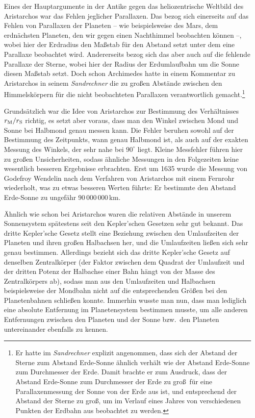 Eines der Hauptargumente in der Antike gegen das heliozentrische Weltbild des Aristarchos war 
das Fehlen jeglicher Parallaxen. Das bezog sich einerseits auf das Fehlen von Parallaxen der 
Planeten -- wie beispielsweise des Mars, dem erdn\"achsten Planeten, den wir gegen einen Nachthimmel 
beobachten k\"onnen --, wobei hier der Erdradius den Ma\ss stab f\"ur den Abstand setzt
unter dem eine Parallaxe beobachtet wird. Andererseits bezog sich das aber auch auf die 
fehlende Parallaxe der Sterne,
wobei hier der Radius der Erdumlaufbahn um die Sonne diesen Ma\ss stab setzt. Doch schon
Archimedes hatte in einem Kommentar zu Aristarchos in seinem 
\textit{Sandrechner} die
zu gro\ss en Abst\"ande zwischen den Himmelsk\"orpern f\"ur die nicht beobachteten Parallaxen 
verantwortlich gemacht.\footnote{Er hatte im \textit{Sandrechner}
explizit angenommen, dass sich der Abstand der Sterne zum Abstand Erde-Sonne \"ahnlich verh\"alt
wie der Abstand Erde-Sonne zum Durchmesser der Erde. Damit brachte er zum Ausdruck, dass
der Abstand Erde-Sonne zum Durchmesser der Erde zu gro\ss\ f\"ur eine Parallaxenmessung
der Sonne von der Erde aus ist, und entsprechend der Abstand der Sterne zu gro\ss, um
im Verlauf eines Jahres von verschiedenen Punkten der Erdbahn aus beobachtet zu werden.}  

Grunds\"atzlich war die Idee von Aristarchos zur Bestimmung des Verh\"altnisses $r_{\rm M}/r_{\rm S}$
richtig, es setzt aber voraus, dass man den Winkel zwischen Mond und Sonne bei
Halbmond genau messen kann. Die Fehler beruhen sowohl auf der Bestimmung
des Zeitpunkts, wann genau Halbmond ist, als auch auf der exakten Messung des Winkels, der sehr 
nahe bei $90^\circ$ liegt. Kleine Messfehler f\"uhren hier zu gro\ss en Unsicherheiten, sodass
\"ahnliche Messungen in den Folgezeiten keine wesentlich besseren Ergebnisse erbrachten.
Erst um 1635 wurde die Messung von Godefroy Wendelin nach dem Verfahren von Aristarchos
mit einem Fernrohr wiederholt, was zu 
etwas besseren Werten f\"uhrte: Er bestimmte den Abstand Erde-Sonne zu ungef\"ahr 90\,000\,000\,km.

\"Ahnlich wie schon bei Aristarchos waren die relativen Abst\"ande in unserem Sonnensystem
sp\"atestens seit den Kepler'schen Gesetzen sehr gut bekannt. Das dritte Kepler'sche 
Gesetz 
stellt eine Beziehung zwischen den Umlaufzeiten der Planeten und ihren
gro\ss en Halbachsen her, und die Umlaufzeiten lie\ss en sich sehr genau bestimmen. 
Allerdings bezieht sich das dritte Kepler'sche Gesetz auf denselben Zentralk\"orper 
(der Faktor zwischen dem Quadrat der Umlaufzeit und der dritten Potenz der Halbachse
einer Bahn h\"angt von der Masse des Zentralk\"orpers ab), sodass man aus den 
Umlaufzeiten und Halbachsen beispielsweise der Mondbahn nicht auf die entsprechenden
Gr\"o\ss en bei den Planetenbahnen schlie\ss en konnte. Immerhin wusste man nun, dass
man lediglich eine absolute Entfernung im Planetensystem bestimmen musste, um alle
anderen Entfernungen zwischen den Planeten und der Sonne bzw.\ den Planeten
untereinander ebenfalls zu kennen. 

